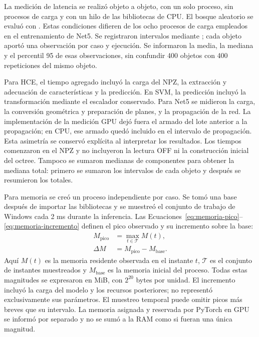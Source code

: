 La medición de latencia se realizó objeto a objeto, con un solo proceso, sin procesos de carga y con un hilo de las bibliotecas de CPU. El bosque aleatorio se evaluó con \protect{}. Estas condiciones difieren de los ocho procesos de carga empleados en el entrenamiento de Net5. Se registraron intervalos mediante \protect{}; cada objeto aportó una observación por caso y ejecución. Se informaron la media, la mediana y el percentil 95 de esas observaciones, sin confundir 400 objetos con 400 repeticiones del mismo objeto.

Para HCE, el tiempo agregado incluyó la carga del NPZ, la extracción y adecuación de características y la predicción. En SVM, la predicción incluyó la transformación mediante el escalador conservado. Para Net5 se midieron la carga, la conversión geométrica y preparación de planes, y la propagación de la red. La implementación de la medición GPU dejó fuera el armado del lote anterior a la propagación; en CPU, ese armado quedó incluido en el intervalo de propagación. Esta asimetría se conservó explícita al interpretar los resultados. Los tiempos comenzaron en el NPZ y no incluyeron la lectura OFF ni la construcción inicial del octree. Tampoco se sumaron medianas de componentes para obtener la mediana total: primero se sumaron los intervalos de cada objeto y después se resumieron los totales.

Para memoria se creó un proceso independiente por caso. Se tomó una base después de importar las bibliotecas y se muestreó el conjunto de trabajo de Windows cada 2 ms durante la inferencia. Las Ecuaciones~\eqref{eq:memoria-pico}--\eqref{eq:memoria-incremento} definen el pico observado y su incremento sobre la base:
\begin{subequations}\label{eq:memoria-comparacion}
\begin{align}
M_{\mathrm{pico}}&=\max_{t\in\mathcal{T}}M(t),\label{eq:memoria-pico}\\
\Delta M&=M_{\mathrm{pico}}-M_{\mathrm{base}}.\label{eq:memoria-incremento}
\end{align}
\end{subequations}
Aquí $M(t)$ es la memoria residente observada en el instante $t$, $\mathcal{T}$ es el conjunto de instantes muestreados y $M_{\mathrm{base}}$ es la memoria inicial del proceso. Todas estas magnitudes se expresaron en MiB, con $2^{20}$ bytes por unidad. El incremento incluyó la carga del modelo y los recursos posteriores; no representó exclusivamente sus parámetros. El muestreo temporal puede omitir picos más breves que su intervalo. La memoria asignada y reservada por PyTorch en GPU se informó por separado y no se sumó a la RAM como si fueran una única magnitud.

